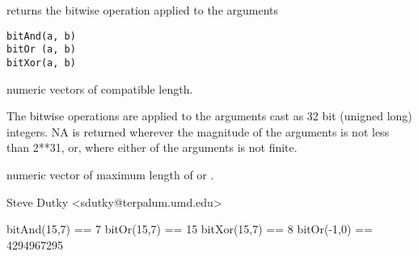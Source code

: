 \begin{Description}\relax
returns the bitwise operation applied to the arguments
\end{Description}
\begin{Usage}
\begin{verbatim}
bitAnd(a, b)
bitOr (a, b)
bitXor(a, b)
\end{verbatim}
\end{Usage}
\begin{Arguments}
\begin{ldescription}
\item[\code{a,b}] numeric vectors of compatible length.
\end{ldescription}
\end{Arguments}
\begin{Details}\relax
The bitwise operations are applied to the arguments cast as 32 bit
(unigned long) integers.  NA is returned wherever the magnitude of the
arguments is not less than 2**31, or, where either of the arguments is
not finite.
\end{Details}
\begin{Value}
numeric vector of maximum length of  or .
\end{Value}
\begin{Author}\relax
Steve Dutky \textless{}sdutky@terpalum.umd.edu\textgreater{}
\end{Author}
\begin{Examples}
\begin{ExampleCode}
        bitAnd(15,7) == 7
        bitOr(15,7) == 15
        bitXor(15,7) == 8
        bitOr(-1,0) == 4294967295

\end{ExampleCode}
\end{Examples}


